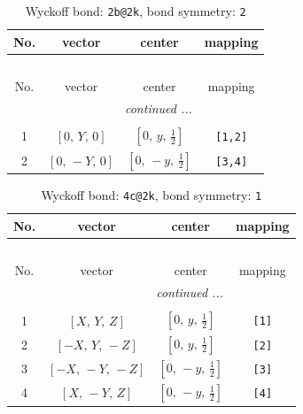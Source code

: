 \documentclass[fleqn,8pt]{jsarticle}
\begin{document}
\renewcommand{\arraystretch}{1.2}
\begin{longtable}{cccc}
\caption{Wyckoff bond: {\tt 2b@2k}, bond symmetry: {\tt 2}}
 \\
 \hline \hline
No. & vector & center & mapping \\ \hline \endfirsthead

\multicolumn{3}{l}{\tablename\ \thetable{}} \\
 \hline \hline
No. & vector & center & mapping \\ \hline \endhead

 \hline \hline
\multicolumn{3}{r}{\footnotesize\it continued ...} \\ \endfoot

 \hline \hline
\multicolumn{3}{r}{} \\ \endlastfoot

1 & $\left[ 0,\, Y,\, 0 \right]$ & $\left[ 0,\, y,\, \frac{1}{2} \right]$ & {\tt [1,2]} \\ \hline
2 & $\left[ 0,\, - Y,\, 0 \right]$ & $\left[ 0,\, - y,\, \frac{1}{2} \right]$ & {\tt [3,4]} \\
\end{longtable}
\renewcommand{\arraystretch}{1.2}
\begin{longtable}{cccc}
\caption{Wyckoff bond: {\tt 4c@2k}, bond symmetry: {\tt 1}}
 \\
 \hline \hline
No. & vector & center & mapping \\ \hline \endfirsthead

\multicolumn{3}{l}{\tablename\ \thetable{}} \\
 \hline \hline
No. & vector & center & mapping \\ \hline \endhead

 \hline \hline
\multicolumn{3}{r}{\footnotesize\it continued ...} \\ \endfoot

 \hline \hline
\multicolumn{3}{r}{} \\ \endlastfoot

1 & $\left[ X,\, Y,\, Z \right]$ & $\left[ 0,\, y,\, \frac{1}{2} \right]$ & {\tt [1]} \\ \hline
2 & $\left[ - X,\, Y,\, - Z \right]$ & $\left[ 0,\, y,\, \frac{1}{2} \right]$ & {\tt [2]} \\ \hline
3 & $\left[ - X,\, - Y,\, - Z \right]$ & $\left[ 0,\, - y,\, \frac{1}{2} \right]$ & {\tt [3]} \\ \hline
4 & $\left[ X,\, - Y,\, Z \right]$ & $\left[ 0,\, - y,\, \frac{1}{2} \right]$ & {\tt [4]} \\
\end{longtable}
\end{document}
